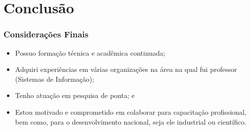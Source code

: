 \documentclass{beamer}
\begin{document}
\section{Conclusão}

\begin{frame}
	\frametitle{Considerações Finais}

	\begin{itemize}
		\item Possuo formação técnica e acadêmica continuada;
		\item Adquiri experiências em várias organizações na área na qual fui
		professor (Sistemas de Informação);
		\item Tenho atuação em pesquisa de ponta; e
		\item Estou motivado e comprometido em colaborar para capacitação
		profissional, bem como, para o desenvolvimento nacional, seja ele industrial ou científico.
	\end{itemize}
\end{frame}
\end{document}
